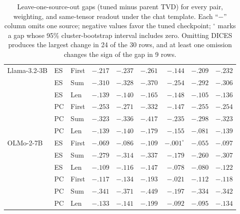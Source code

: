 \begin{table}[t]
\begin{tabular}{@{}lllrrrrrr@{}}
\addlinespace[2pt]
Llama-3.2-3B & ES & First & $-.217$ & $-.237$ & $-.261$ & $-.144$ & $-.209$ & $-.232$ \\
 & ES & Sum & $-.310$ & $-.328$ & $-.370$ & $-.254$ & $-.292$ & $-.306$ \\
 & ES & Len & $-.139$ & $-.140$ & $-.165$ & $-.148$ & $-.105$ & $-.136$ \\
 & PC & First & $-.253$ & $-.271$ & $-.332$ & $-.147$ & $-.255$ & $-.254$ \\
 & PC & Sum & $-.323$ & $-.336$ & $-.417$ & $-.235$ & $-.298$ & $-.323$ \\
 & PC & Len & $-.139$ & $-.140$ & $-.179$ & $-.155$ & $-.081$ & $-.139$ \\
\addlinespace[2pt]
OLMo-2-7B & ES & First & $-.069$ & $-.086$ & $-.109$ & $-.001^{\circ}$ & $-.055$ & $-.097$ \\
 & ES & Sum & $-.279$ & $-.314$ & $-.337$ & $-.179$ & $-.260$ & $-.307$ \\
 & ES & Len & $-.109$ & $-.116$ & $-.147$ & $-.078$ & $-.080$ & $-.122$ \\
 & PC & First & $-.117$ & $-.134$ & $-.193$ & $-.021$ & $-.112$ & $-.118$ \\
 & PC & Sum & $-.341$ & $-.371$ & $-.449$ & $-.197$ & $-.334$ & $-.342$ \\
 & PC & Len & $-.133$ & $-.141$ & $-.199$ & $-.092$ & $-.095$ & $-.134$ \\
\bottomrule
\end{tabular}
\caption{Leave-one-source-out gaps (tuned minus parent TVD) for every pair, weighting, and same-tensor readout under the chat template. Each ``$-$'' column omits one source; negative values favor the tuned checkpoint; $^{\circ}$ marks a gap whose 95\% cluster-bootstrap interval includes zero. Omitting DICES produces the largest change in 24 of the 30 rows, and at least one omission changes the sign of the gap in 9 rows.}
\label{tab:loo-all-pairs}
\end{table}
